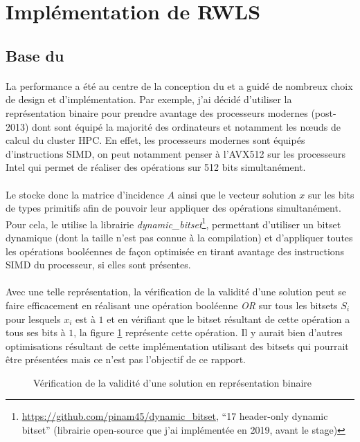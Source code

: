 \documentclass[a4paper,11pt,twoside,french,report]{../common/simplem}
\begin{document}
		\section{Implémentation de \acrshort{RWLS}}\label{sec:impl_RWLS}
			\subsection{Base du \solver{}}
				\paragraph*{}
					La performance a été au centre de la conception du \solver{} et a guidé de nombreux choix de design et d'implémentation. Par exemple, j'ai décidé d'utiliser la représentation binaire pour prendre avantage des processeurs modernes (post-2013) dont sont équipé la majorité des ordinateurs et notamment les nœuds de calcul du cluster \gls{HPC}. En effet, les processeurs modernes sont équipés d'instructions \gls{SIMD}, on peut notamment penser à l'AVX512 sur les processeurs Intel qui permet de réaliser des opérations sur 512 bits simultanément.
				\paragraph*{}
					Le \solver{} stocke donc la matrice d'incidence \(A\) ainsi que le vecteur solution \(x\) sur les bits de types primitifs \Cpp{} afin de pouvoir leur appliquer des opérations simultanément. Pour cela, le \solver{} utilise la librairie \textit{dynamic\_bitset}\footnote{\url{https://github.com/pinam45/dynamic_bitset}, ``\Cpp{}17 header-only dynamic bitset'' (librairie open-source que j'ai implémentée en 2019, avant le stage)}, permettant d'utiliser un bitset dynamique (dont la taille n'est pas connue à la compilation) et d'appliquer toutes les opérations booléennes de façon optimisée en tirant avantage des instructions \gls{SIMD} du processeur, si elles sont présentes.
				\paragraph*{}
					Avec une telle représentation, la vérification de la validité d'une solution peut se faire efficacement en réalisant une opération booléenne \textit{OR} sur tous les bitsets \(S_i\) pour lesquels \(x_i\) est à \(1\) et en vérifiant que le bitset résultant de cette opération a tous ses bits à \(1\), la figure \ref{fig:binary_representation_solution_check} représente cette opération. Il y aurait bien d’autres optimisations résultant de cette implémentation utilisant des bitsets qui pourrait être présentées mais ce n'est pas l'objectif de ce rapport.
				\begin{figure}[H]
					\centering%
					\resizebox{\textwidth}{!}{}%
					\caption{Vérification de la validité d'une solution en représentation binaire}%
					\label{fig:binary_representation_solution_check}%
				\end{figure}
\end{document}
